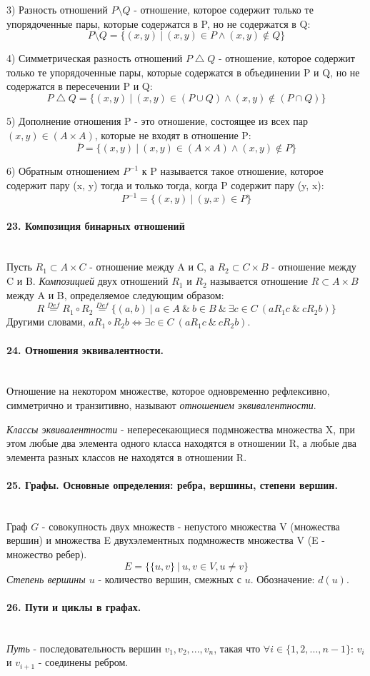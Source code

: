 \documentclass[a4paper, 12pt]{article}
\newcommand{\parag}[1]{\paragraph{#1}\mbox{}\\}
\begin{document}
3) Разность отношений $P \setminus Q$ - отношение, которое содержит только те упорядоченные пары, которые содержатся в P, но не содержатся в Q:
\[
    P \setminus Q = \{(x, y)\ |\ (x, y) \in P \land (x, y) \notin Q\}
\]

4) Симметрическая разность отношений $P \bigtriangleup Q$ - отношение, которое содержит только те упорядоченные пары, которые содержатся в объединении P и Q, но не содержатся в пересечении P и Q:
\[
    P \bigtriangleup Q = \{(x, y)\ |\ (x, y) \in (P \cup Q) \land (x, y) \notin (P \cap Q)\}
\]

5) Дополнение отношения P - это отношение, состоящее из всех пар $(x, y) \in (A \times A)$, которые не входят в отношение P:
\[
    \bar P = \{(x, y)\ |\ (x, y) \in (A \times A) \land (x, y) \notin P\}
\]

6) Обратным отношением $P^{-1}$ к P называется такое отношение, которое содержит пару (x, y) тогда и только тогда, когда P содержит пару (y, x):
\[
    P^{-1} = \{(x, y)\ |\ (y, x) \in P\}
\]

\parag{23. Композиция бинарных отношений}
Пусть $R_{1} \subset A \times C$ - отношение между A и С, а $R_{2} \subset C \times B$ - отношение между C и B. \textit{Композицией} двух отношений $R_{1}$ и $R_{2}$ называется отношение $R \subset A \times B$ между A и B, определяемое следующим образом:
\[
    R \overset{Def}{=} R_{1} \circ R_{2} \overset{Def}{=} \{(a, b)\ |\ a \in A\ \&\ b \in B\ \&\ \exists c \in C\ (aR_{1}c\ \&\ cR_{2}b)\}
\]
Другими словами, $aR_{1} \circ R_{2}b \iff \exists c \in C\ (aR_{1}c\ \&\ cR_{2}b)$.

\parag{24. Отношения эквивалентности.}
Отношение на некотором множестве, которое одновременно рефлексивно, симметрично и транзитивно, называют \textit{отношением эквивалентности}.

\noindent
\textit{Классы эквивалентности} - непересекающиеся подмножества множества X, при этом любые два элемента одного класса находятся в
отношении R, а любые два элемента разных классов не находятся в отношении R.

\parag{25. Графы. Основные определения: ребра, вершины, степени вершин.}
Граф $G$ - совокупность двух множеств - непустого множества V (множества вершин) и множества E двухэлементных подмножеств множества V (E - множество ребер).
\[
    E = \{ \{u, v\}\ |\ u, v \in V, u \neq v \}
\]
\textit{Степень вершины $u$} - количество вершин, смежных с $u$. Обозначение: $d(u)$.

\parag{26. Пути и циклы в графах.}
\textit{Путь} - последовательность вершин $v_{1}, v_{2}, ..., v_{n}$, такая что $\forall i \in \{1, 2, ..., n - 1\}$: $v_{i}$ и $v_{i+1}$ - соединены ребром.
\end{document}

